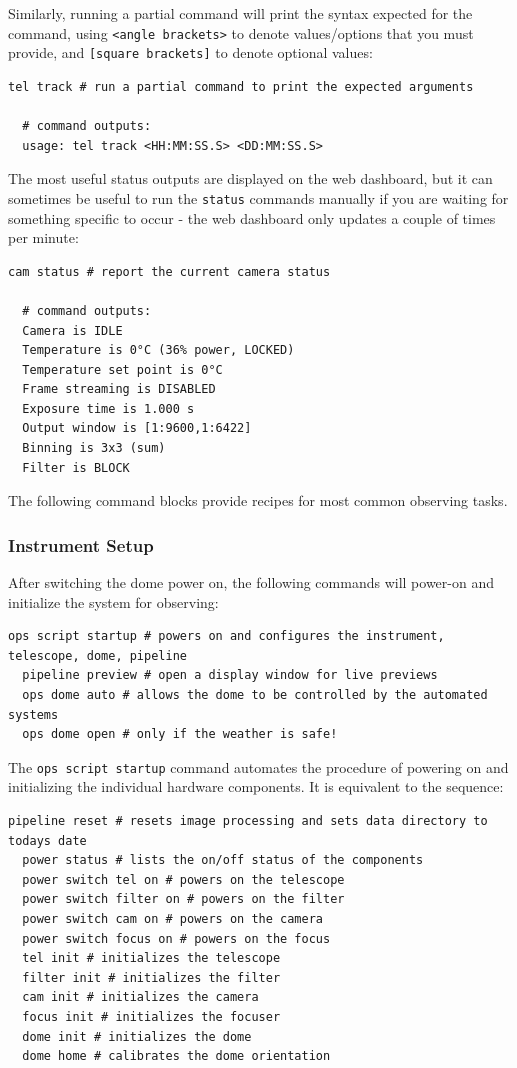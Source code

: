 \documentclass[12pt,a4paper]{article}
\begin{document}
Similarly, running a partial command will print the syntax expected for the command, using \texttt{<angle~brackets>} to denote values/options that you must provide, and \texttt{[square~brackets]} to denote optional values:
\\
\begin{lstlisting}[language=commands]
  tel track # run a partial command to print the expected arguments

  # command outputs:
  usage: tel track <HH:MM:SS.S> <DD:MM:SS.S>
\end{lstlisting}

The most useful status outputs are displayed on the web dashboard, but it can sometimes be useful to run the \texttt{status} commands manually if you are waiting for something specific to occur - the web dashboard only updates a couple of times per minute:
\\
\begin{lstlisting}[language=commands]
  cam status # report the current camera status

  # command outputs:
  Camera is IDLE
  Temperature is 0°C (36% power, LOCKED)
  Temperature set point is 0°C
  Frame streaming is DISABLED
  Exposure time is 1.000 s
  Output window is [1:9600,1:6422]
  Binning is 3x3 (sum)
  Filter is BLOCK
\end{lstlisting}

The following command blocks provide recipes for most common observing tasks.

\subsubsection{Instrument Setup}\label{sec:setupcommands}

After switching the dome power on, the following commands will power-on and initialize the system for observing:
\\
\begin{lstlisting}[language=commands]
  ops script startup # powers on and configures the instrument, telescope, dome, pipeline
  pipeline preview # open a display window for live previews
  ops dome auto # allows the dome to be controlled by the automated systems
  ops dome open # only if the weather is safe!
\end{lstlisting}

The \texttt{ops script startup} command automates the procedure of powering on and initializing the individual hardware components. It is equivalent to the sequence:
\\
\begin{lstlisting}[language=commands]
  pipeline reset # resets image processing and sets data directory to todays date
  power status # lists the on/off status of the components
  power switch tel on # powers on the telescope
  power switch filter on # powers on the filter
  power switch cam on # powers on the camera
  power switch focus on # powers on the focus
  tel init # initializes the telescope
  filter init # initializes the filter
  cam init # initializes the camera
  focus init # initializes the focuser
  dome init # initializes the dome
  dome home # calibrates the dome orientation
\end{lstlisting}
\end{document}
